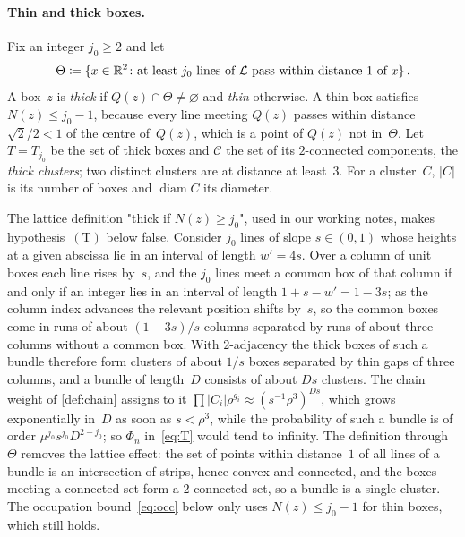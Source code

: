 \documentclass[11pt,letterpaper]{article}
\DeclareMathOperator{\diam}{diam}
\begin{document}
\paragraph{Thin and thick boxes.} Fix an integer $j_0\ge2$ and let
\begin{equation}
\label{eq:Theta}
  \Theta\coloneqq\{x\in\mathbb R^2\colon\text{at least }j_0\text{ lines of }\mathcal L\text{ pass within distance }1\text{ of }x\}\,.
\end{equation}
A box~$z$ is \emph{thick} if $Q(z)\cap\Theta\neq\varnothing$ and \emph{thin} otherwise. A thin box satisfies $N(z)\le j_0-1$, because every line meeting $Q(z)$ passes within distance $\sqrt2/2<1$ of the centre of~$Q(z)$, which is a point of $Q(z)$ not in~$\Theta$. Let $T=T_{j_0}$ be the set of thick boxes and $\mathcal C$ the set of its $2$-connected components, the \emph{thick clusters}; two distinct clusters are at distance at least~$3$. For a cluster~$C$, $\lvert C\rvert$ is its number of boxes and $\diam C$ its diameter.

\begin{remark}
\label{rem:continuum}
The lattice definition "thick if $N(z)\ge j_0$", used in our working notes, makes hypothesis~$\mathrm{(T)}$ below false. Consider $j_0$ lines of slope $s\in(0,1)$ whose heights at a given abscissa lie in an interval of length $w'=4s$. Over a column of unit boxes each line rises by~$s$, and the $j_0$ lines meet a common box of that column if and only if an integer lies in an interval of length $1+s-w'=1-3s$; as the column index advances the relevant position shifts by~$s$, so the common boxes come in runs of about $(1-3s)/s$ columns separated by runs of about three columns without a common box. With $2$-adjacency the thick boxes of such a bundle therefore form clusters of about $1/s$ boxes separated by thin gaps of three columns, and a bundle of length~$D$ consists of about $Ds$ clusters. The chain weight of \cref{def:chain} assigns to it $\prod\lvert C_i\rvert\rho^{g_i}\approx(s^{-1}\rho^{3})^{Ds}$, which grows exponentially in~$D$ as soon as $s<\rho^3$, while the probability of such a bundle is of order $\mu^{j_0}s^{j_0}D^{2-j_0}$; so $\Phi_n$ in~\eqref{eq:T} would tend to infinity. The definition through~$\Theta$ removes the lattice effect: the set of points within distance~$1$ of all lines of a bundle is an intersection of strips, hence convex and connected, and the boxes meeting a connected set form a $2$-connected set, so a bundle is a single cluster. The occupation bound~\eqref{eq:occ} below only uses $N(z)\le j_0-1$ for thin boxes, which still holds.
\end{remark}
\end{document}
